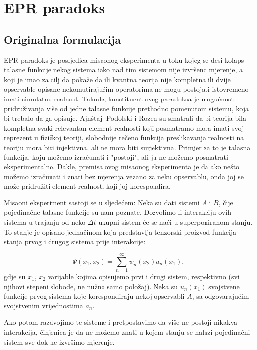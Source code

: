 \chapter{EPR paradoks}
\section{Originalna formulacija}
EPR paradoks je posljedica misaonog eksperimenta u toku kojeg se desi kolaps talasne funkcije nekog sistema iako nad tim sistemom nije izvršeno mjerenje, a koji je imao za cilj da pokaže da ili kvantna teorija nije kompletna ili dvije opservable opisane nekomutirajućim operatorima ne mogu postojati istovremeno - imati simulatnu realnost. Takođe, konstituent ovog paradoksa je mogućnost pridruživanja više od jedne talasne funkcije prethodno pomenutom sistemu, koja bi trebalo da ga opisuje.
Ajnštaj, Podolski i Rozen su smatrali da bi teorija bila kompletna svaki relevantan element realnosti koji posmatramo mora imati svoj reprezent u fizičkoj teoriji, slobodnije rečeno funkcija preslikavanja realnosti na teoriju mora biti injektivna, ali ne mora biti surjektivna. Primjer za to je talasna funkcija, koju možemo izračunati i "postoji", ali ju ne možemo posmatrati eksperimentalno.
Dakle, premisa ovog misaonog eksperimenta je da ako nešto možemo izračunati i znati bez mjerenja vezano za neku opservablu, onda joj se može pridružiti element realnosti koji joj korespondira.

Misaoni eksperiment sastoji se u sljedećem:
Neka su dati sistemi $A$ i $B$, čije pojedinačne talasne funkcije su nam poznate. Dozvolimo li interakciju ovih sistema u trajanju od neko $\Delta t$ ukupni sistem će se naći u superponiranom stanju.
To stanje je opisano jednačinom koja predstavlja tenzorski proizvod funkcija stanja prvog i drugog sistema prije interakcije:

\begin{equation}
    \Psi(x_1, x_2) = \sum_{n=1}^{\infty} \psi_n(x_2)u_n(x_1),
\end{equation}
gdje su $x_1$, $x_2$ varijable kojima opisujemo prvi i drugi sistem, respektivno (svi njihovi stepeni slobode, ne nužno samo položaj).
Neka su $u_n(x_1)$ svojstvene funkcije prvog sistema koje korespondiraju nekoj opservabli $A$, sa odgovarajućim svojstvenim vrijednostima $a_n$.

Ako potom razdvojimo te sisteme i pretpostavimo da više ne postoji nikakva interakcija, činjenica je da ne možemo znati u kojem stanju se nalazi pojedinačni sistem sve dok ne izvršimo mjerenje.

